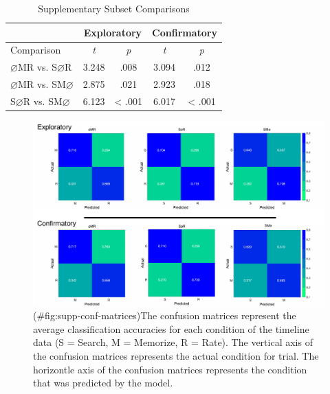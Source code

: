 \begin{appendix}
\begin{table}[!h]
    \centering
    \caption{Supplementary Subset Comparisons}
    \label{tab:supp-comparisons}
    \begin{tabular}{l c c c c}
         & \multicolumn{2}{c}{Exploratory} & \multicolumn{2}{c}{Confirmatory} \\
        \hline
        Comparison & \textit{t} & \multicolumn{1}{c|}{\textit{p}} & \textit{t} & \textit{p} \\
        \hline
        $\varnothing$MR vs. S$\varnothing$R & 3.248 & \multicolumn{1}{c|}{.008} & 3.094 & .012 \\
        $\varnothing$MR vs. SM$\varnothing$ & 2.875 & \multicolumn{1}{c|}{.021} & 2.923 & .018 \\
        S$\varnothing$R vs. SM$\varnothing$ & 6.123 & \multicolumn{1}{c|}{< .001} & 6.017 & < .001 \\
        \hline
    \end{tabular}
\end{table}

\begin{figure}
\centering
\includegraphics{supplementary_analysis/confusion_matrices/supp_conf_matrices.pdf}
\caption{(\#fig:supp-conf-matrices)The confusion matrices represent the
average classification accuracies for each condition of the timeline
data (S = Search, M = Memorize, R = Rate). The vertical axis of the
confusion matrices represents the actual condition for trial. The
horizontle axis of the confusion matrices represents the condition that
was predicted by the model.}
\end{figure}


\end{appendix}

